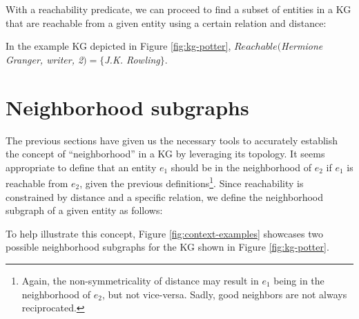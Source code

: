 With a reachability predicate, we can proceed to find a subset of entities in a KG that are reachable from a given entity using a certain relation and distance:


In the example KG depicted in Figure \ref{fig:kg-potter}, $Reachable($\textit{Hermione Granger, writer, 2}$) = \{$\textit{J.K. Rowling}$\}$.

\section{Neighborhood subgraphs}\label{sec:theo-subgraph}
The previous sections have given us the necessary tools to accurately establish the concept of ``neighborhood'' in a KG by leveraging its topology. It seems appropriate to define that an entity $e_1$ should be in the neighborhood of $e_2$ if $e_1$ is reachable from $e_2$, given the previous definitions\footnote{Again, the non-symmetricality of distance may result in $e_1$ being in the neighborhood of $e_2$, but not vice-versa. Sadly, good neighbors are not always reciprocated.}. Since reachability is constrained by distance and a specific relation, we define the neighborhood subgraph of a given entity as follows:


To help illustrate this concept, Figure \ref{fig:context-examples} showcases two possible neighborhood subgraphs for the KG shown in Figure \ref{fig:kg-potter}.

